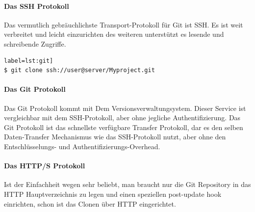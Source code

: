 \documentclass[12pt,a4paper,bibliography=totocnumbered,listof=totocnumbered]{scrartcl}
\begin{document}
\paragraph{Das SSH Protokoll}
Das vermutlich gebräuchlichste Transport-Protokoll für Git ist SSH.
Es ist weit verbreitet und leicht einzurichten des weiteren unterstützt es lesende und schreibende Zugriffe.

\begin{lstlisting}[caption=Mit Präfix] label=lst:git]
$ git clone ssh://user@server/Myproject.git
\end{lstlisting}

\paragraph{Das Git Protokoll}
Das Git Protokoll kommt mit Dem Versionsverwaltungsystem.
Dieser Service ist vergleichbar mit dem SSH-Protokoll, aber ohne jegliche Authentifizierung. Das Git Protokoll ist das schnellste verfügbare Transfer Protokoll, dar es den selben Daten-Transfer Mechanismus wie das SSH-Protokoll nutzt, aber ohne den Entschlüsselungs- und Authentifizierungs-Overhead.

\paragraph{Das HTTP/S Protokoll}
Ist der Einfachheit wegen sehr beliebt, man braucht nur die Git Repository in das HTTP Hauptverzeichnis zu legen und einen speziellen post-update hook einrichten, schon ist das Clonen über HTTP eingerichtet.  

\newpage
\renewcommand\refname{Quellenverzeichnis}


\pagebreak

\setcounter{page}{1}
\end{document}
